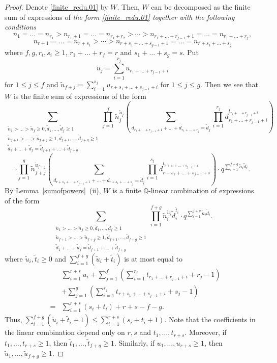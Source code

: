 \documentclass[12pt, reqno]{amsart}
\theoremstyle{definition}
\theoremstyle{remark}
\numberwithin{equation}{section}
\newcommand{\Q}{ \mathbb Q }
\newcommand{\w}{\tilde}
\numberwithin{equation}{section}
\begin{document}
\begin{proof}
Denote \eqref{finite_redu.01} by $W$. Then, $W$ can be decomposed as 
the finite sum of expressions of {\it the form \eqref{finite_redu.01} 
together with the following conditions}
$$
n_{1} = \ldots = n_{r_1} > n_{r_1+1} = \ldots = n_{r_1+r_2} > \cdots 
> n_{r_1+\ldots + r_{f-1} +1} = \ldots = n_{r_1+\ldots + r_{f}},
$$
$$
n_{r+1} = \ldots = n_{r+s_1} > 
\cdots > n_{r+s_1+\ldots + s_{g-1} +1} = \ldots = n_{r+ s_1+\ldots + s_g}
$$ 
where $f, g, r_i, s_i \ge 1$, $r_1+\ldots + r_{f} = r$ and 
$s_1+\ldots + s_g = s$. Put 
$$
\w u_j = \sum_{i=1}^{r_j} u_{r_1+\ldots+r_{j-1}+i}
$$ 
for $1 \le j \le f$ and 
$\w u_{f+j} 
= \sum_{i=1}^{s_j} u_{r+s_1+\ldots+s_{j-1}+i}$ for $1 \le j \le g$.
Then we see that $W$ is the finite sum of expressions of the form
$$
\sum_{\substack{\w n_1 > \ldots > \w n_f \ge 0, 
    \w d_1, \ldots, \w d_f \ge 1\\
    \w n_{f+1}> \ldots > \w n_{f+g} \ge 1, 
    \w d_{f+1}, \ldots, \w d_{f+g} \ge 1\\
    \w d_1+ \ldots + \w d_f = \w d_{f+1} + \ldots + \w d_{f+g}}}
    \prod_{j=1}^{f} \w n_j^{\w u_j} \left (\sum_{d_{r_1+\ldots+r_{j-1}+1} 
    + \ldots + d_{{r_1+\ldots+r_{j}}} = \w d_j} \prod_{i=1}^{r_j} 
    d_{r_1+\ldots+r_{j-1}+i}^{t_{r_1+\ldots+r_{j-1}+i}} \right )
$$
$$
\cdot \prod_{j=1}^{g} \w n_{f+j}^{\w u_{f+j}} 
    \left (\sum_{d_{r+s_1+\ldots+s_{j-1}+1} 
    + \ldots + d_{{r+s_1+\ldots+s_{j}}} = \w d_j} \prod_{i=1}^{s_j} 
    d_{r+s_1+\ldots+s_{j-1}+i}^{t_{r+s_1+\ldots+s_{j-1}+i}} \right )
    \cdot q^{\sum_{i=1}^{f+g} \w n_i \w d_i}.
$$
By Lemma~\ref{sumofpowers}~(ii), $W$ 
is a finite $\Q$-linear combination of expressions of the form
$$
\sum_{\substack{\w n_1 > \ldots > \w n_f \ge 0, 
    \w d_1, \ldots, \w d_f \ge 1\\
    \w n_{f+1}> \ldots > \w n_{f+g} \ge 1, 
    \w d_{f+1}, \ldots, \w d_{f+g} \ge 1\\
    \w d_1+ \ldots + \w d_f = \w d_{f+1} + \ldots + \w d_{f+g}}}
    \prod_{i=1}^{f+g} \w n_i^{\w u_i} \w d_i^{\w t_i} 
    \cdot q^{\sum_{i=1}^{f+g} \w n_i \w d_i}.
$$
where $\w u_i, \w t_i \ge 0$ and $\sum_{i=1}^{f+g} (\w u_i + \w t_i)$ 
is at most equal to
\begin{eqnarray*}
& &\sum_{i=1}^{r+s} u_i 
   + \sum_{j=1}^f \left (\sum_{i=1}^{r_j} t_{r_1+\ldots+
       r_{j-1}+i} + r_j - 1 \right )   \\
& &+ \sum_{j=1}^g \left (\sum_{i=1}^{s_j} t_{r+s_1+\ldots+
       s_{j-1}+i} + s_j - 1 \right )   \\
&=&\sum_{i=1}^{r+s} (s_i+t_i) + r+s -f-g. 
\end{eqnarray*}
Thus, $\sum_{i=1}^{f+g} (\w u_i + \w t_i +1) 
\le \sum_{i=1}^{r+s} (s_i+t_i + 1)$.
Note that the coefficients in the linear combination depend only on 
$r,s$ and $t_1, \ldots, t_{r+s}$. Moreover,
if $t_1, \ldots, t_{r+s} \ge 1$, then $\w t_1, \ldots, \w t_{f+g} \ge 1$. 
Similarly, if $u_1, \ldots, u_{r+s} \ge 1$, 
then $\w u_1, \ldots, \w u_{f+g} \ge 1$.
\end{proof}
\end{document}
